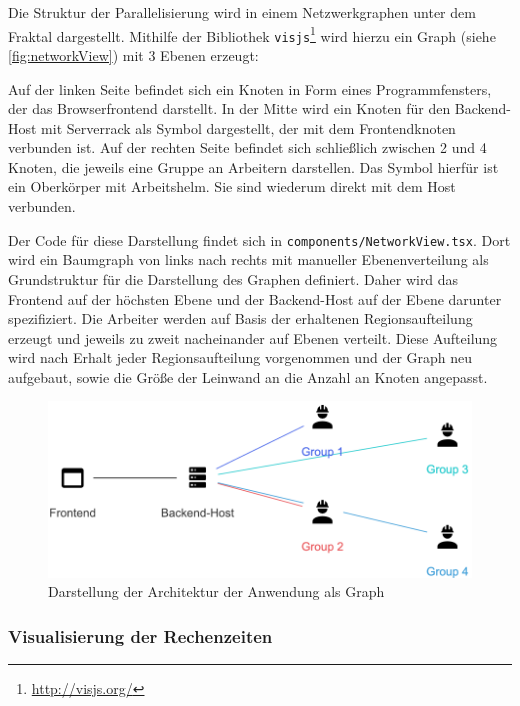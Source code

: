 Die Struktur der Parallelisierung wird in einem Netzwerkgraphen unter dem Fraktal dargestellt.
Mithilfe der Bibliothek \verb|visjs|\footnote{\url{http://visjs.org/}} wird hierzu ein
Graph (siehe \autoref{fig:networkView}) mit 3 Ebenen erzeugt:

Auf der linken Seite befindet sich ein Knoten in Form eines Programmfensters, der das Browserfrontend darstellt.
In der Mitte wird ein Knoten für den Backend-Host mit Serverrack als Symbol dargestellt, der mit dem Frontendknoten verbunden ist.
Auf der rechten Seite befindet sich schließlich zwischen 2 und 4 Knoten, die jeweils eine Gruppe an Arbeitern
darstellen. Das Symbol hierfür ist ein Oberkörper mit Arbeitshelm.
Sie sind wiederum direkt mit dem Host verbunden.

Der Code für diese Darstellung findet sich in \verb|components/NetworkView.tsx|.
Dort wird ein Baumgraph von links nach rechts mit manueller Ebenenverteilung als Grundstruktur für die Darstellung des Graphen definiert.
Daher wird das Frontend auf der höchsten Ebene und der Backend-Host auf der Ebene darunter spezifiziert.
Die Arbeiter werden auf Basis der erhaltenen Regionsaufteilung erzeugt und jeweils zu zweit nacheinander
auf Ebenen verteilt.
Diese Aufteilung wird nach Erhalt jeder Regionsaufteilung vorgenommen und der Graph neu aufgebaut,
sowie die Größe der Leinwand an die Anzahl an Knoten angepasst.

\begin{figure}
	\centering
	\includegraphics[width=0.5\linewidth]{img/Implementierung/NetworkView}
	\caption{Darstellung der Architektur der Anwendung als Graph
	}\label{fig:networkView}
\end{figure}

\subsubsection{Visualisierung der Rechenzeiten} %

